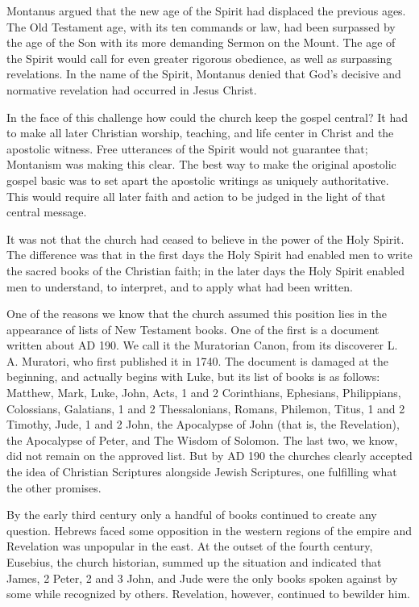 Montanus argued that the new age of the Spirit had displaced the previous ages. The Old Testament
age, with its ten commands or law, had been surpassed by the age of the Son with its more demanding
Sermon on the Mount. The age of the Spirit would call for even greater rigorous obedience, as well
as surpassing revelations. In the name of the Spirit, Montanus denied that God’s decisive and
normative revelation had occurred in Jesus Christ.

In the face of this challenge how could the church keep the gospel central? It had to make all later
Christian worship, teaching, and life center in Christ and the apostolic witness. Free utterances of
the Spirit would not guarantee that; Montanism was making this clear. The best way to make the
original apostolic gospel basic was to set apart the apostolic writings as uniquely authoritative.
This would require all later faith and action to be judged in the light of that central message.

It was not that the church had ceased to believe in the power of the Holy Spirit. The difference was
that in the first days the Holy Spirit had enabled men to write the sacred books of the Christian
faith; in the later days the Holy Spirit enabled men to understand, to interpret, and to apply what
had been written.

One of the reasons we know that the church assumed this position lies in the appearance of lists of
New Testament books. One of the first is a document written about AD 190. We call it the Muratorian
Canon, from its discoverer L. A. Muratori, who first published it in 1740. The document is damaged
at the beginning, and actually begins with Luke, but its list of books is as follows: Matthew, Mark,
Luke, John, Acts, 1 and 2 Corinthians, Ephesians, Philippians, Colossians, Galatians, 1 and 2
Thessalonians, Romans, Philemon, Titus, 1 and 2 Timothy, Jude, 1 and 2 John, the Apocalypse of John
(that is, the Revelation), the Apocalypse of Peter, and The Wisdom of Solomon. The last two, we
know, did not remain on the approved list. But by AD 190 the churches clearly accepted the idea of
Christian Scriptures alongside Jewish Scriptures, one fulfilling what the other promises.

By the early third century only a handful of books continued to create any question. Hebrews faced
some opposition in the western regions of the empire and Revelation was unpopular in the east. At
the outset of the fourth century, Eusebius, the church historian, summed up the situation and
indicated that James, 2 Peter, 2 and 3 John, and Jude were the only books spoken against by some
while recognized by others. Revelation, however, continued to bewilder him.

